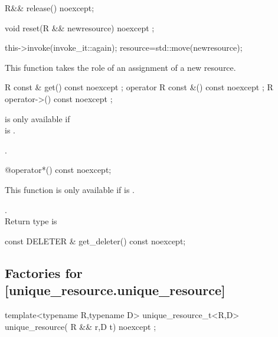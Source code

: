 \documentclass[ebook,11pt,article]{memoir}
\begin{document}
\begin{itemdecl}
R&& release() noexcept;
\end{itemdecl}

\pnum
\effects {}

\pnum
\returns {}

\begin{itemdecl}
void reset(R && newresource) noexcept ;
\end{itemdecl}

\pnum
\effects 
\begin{codeblock}
this->invoke(invoke_it::again); 
resource=std::move(newresource);
\end{codeblock}

\pnum
\enternote This function takes the role of an assignment of a new resource.
\exitnote

\begin{itemdecl}
R const & get() const noexcept ;
operator  R const &() const noexcept ;
R operator->() const noexcept ;
\end{itemdecl}

\pnum
\requires {} is only available if \\
 is . 

\pnum
\returns {}.

\begin{itemdecl}
@\seebelow@  operator*() const noexcept;
\end{itemdecl}

\pnum
\requires This function is only available if  is . 

\pnum
\returns {}. 
\\Return type is 


\begin{itemdecl}
const DELETER & get_deleter() const noexcept;
\end{itemdecl}

\pnum
\returns {}

\subsection {Factories for  [unique_resource.unique_resource]}
\begin{itemdecl}
template<typename R,typename D>
unique_resource_t<R,D>
unique_resource( R && r,D t) noexcept ;
\end{itemdecl}
\end{document}
